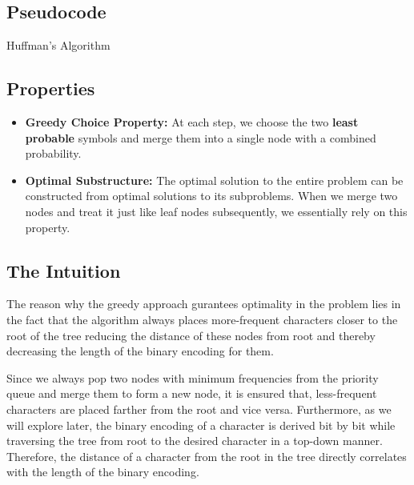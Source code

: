 \documentclass[18pt]{article}
\begin{document}
	\subsection{Pseudocode}
	
	\begin{algorithm}[H]
		\SetAlgoLined
		\DontPrintSemicolon
		\caption{Huffman's Algorithm}
	\end{algorithm}
	
	\subsection{Properties}
	
	\begin{itemize}
		
		\item \textbf{Greedy Choice Property:} At each step, we choose the two \textbf{least probable} symbols and merge them into a single node with a combined probability.
		
		\item \textbf{Optimal Substructure:} The optimal solution to the entire problem can be constructed from optimal solutions to its subproblems. When we merge two nodes and treat it just like leaf nodes subsequently, we essentially rely on this property.
		
	\end{itemize}
	
	\subsection{The Intuition}
	
	The reason why the greedy approach gurantees optimality in the problem lies in the fact that the algorithm always places more-frequent characters closer
	to the root of the tree reducing the distance of these nodes from root and thereby decreasing the length of the binary encoding for them.
	
	Since we always pop two nodes with minimum frequencies from the priority queue and merge them to form a new node, it is ensured that, less-frequent characters are placed farther from the root and vice versa. Furthermore, as we will explore later, the binary encoding of a character is derived bit by bit while traversing the tree from root to the desired character in a top-down manner. Therefore, the distance of a character from the root in the tree directly correlates with the length of the binary encoding.
	
\end{document}
